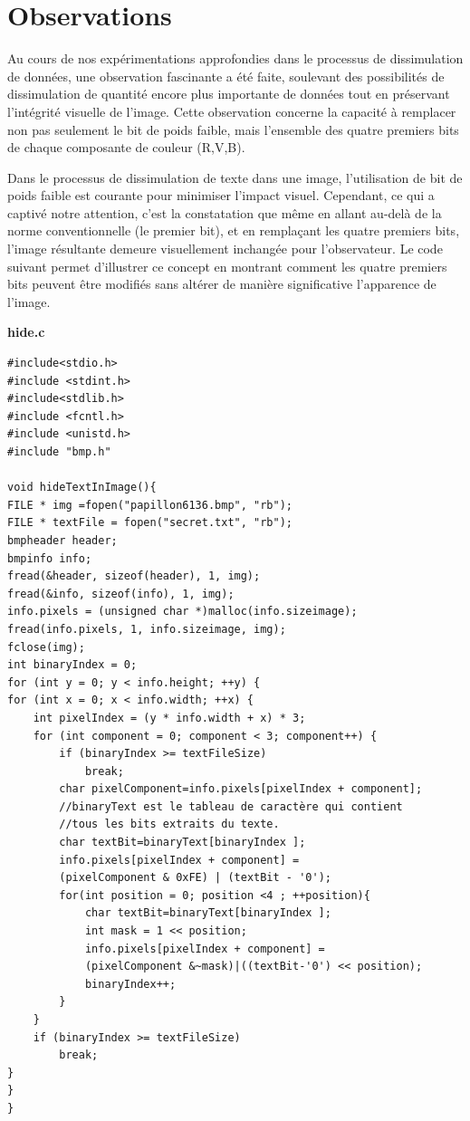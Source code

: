 \documentclass{article}
\begin{document}
\section{Observations}
Au cours de nos expérimentations approfondies dans le processus de dissimulation de données, une observation fascinante a été faite, soulevant des possibilités de dissimulation de quantité encore plus importante de données tout en préservant l'intégrité visuelle de l'image.
Cette observation concerne la capacité à remplacer non pas seulement le bit de poids faible, mais l'ensemble des quatre premiers bits de chaque composante de couleur (R,V,B).

Dans le processus de dissimulation de texte dans une image, l'utilisation de bit de poids faible est courante pour minimiser l'impact visuel. Cependant, ce qui a captivé notre attention, c'est la constatation que même en allant au-delà de la norme conventionnelle (le premier bit), et en remplaçant les quatre premiers bits, l'image résultante demeure visuellement inchangée pour l'observateur. Le code suivant permet d'illustrer ce concept en montrant comment les quatre premiers bits peuvent être modifiés sans altérer de manière significative l'apparence de l'image.
\begin{center}
    \textbf{hide.c}
\end{center}
\begin{framed}
\begin{verbatim}
#include<stdio.h>
#include <stdint.h>
#include<stdlib.h>
#include <fcntl.h>
#include <unistd.h>
#include "bmp.h"

void hideTextInImage(){
FILE * img =fopen("papillon6136.bmp", "rb");
FILE * textFile = fopen("secret.txt", "rb");
bmpheader header;
bmpinfo info;
fread(&header, sizeof(header), 1, img);
fread(&info, sizeof(info), 1, img);
info.pixels = (unsigned char *)malloc(info.sizeimage);
fread(info.pixels, 1, info.sizeimage, img);
fclose(img);
int binaryIndex = 0;
for (int y = 0; y < info.height; ++y) {
for (int x = 0; x < info.width; ++x) {
    int pixelIndex = (y * info.width + x) * 3;
    for (int component = 0; component < 3; component++) {
        if (binaryIndex >= textFileSize)
            break;
        char pixelComponent=info.pixels[pixelIndex + component];
        //binaryText est le tableau de caractère qui contient
        //tous les bits extraits du texte.
        char textBit=binaryText[binaryIndex ];
        info.pixels[pixelIndex + component] =
        (pixelComponent & 0xFE) | (textBit - '0');
        for(int position = 0; position <4 ; ++position){
            char textBit=binaryText[binaryIndex ];
            int mask = 1 << position;
            info.pixels[pixelIndex + component] =
            (pixelComponent &~mask)|((textBit-'0') << position);
            binaryIndex++;
        }
    }
    if (binaryIndex >= textFileSize)
        break;
}
}
}

\end{verbatim}
\end{framed}
\end{document}
